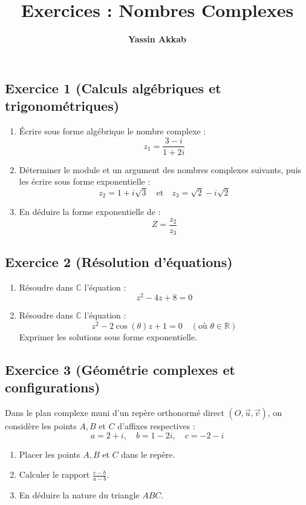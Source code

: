 \documentclass{article}
\title{\textbf{Exercices : Nombres Complexes}}
\author{\textbf{Yassin Akkab}}
\begin{document}
	
	\maketitle
	
	\subsection*{Exercice 1 (Calculs algébriques et trigonométriques)}
	\begin{enumerate}
		\item Écrire sous forme algébrique le nombre complexe :
		\[ z_1 = \frac{3 - i}{1 + 2i} \]
		\item Déterminer le module et un argument des nombres complexes suivants, puis les écrire sous forme exponentielle :
		\[ z_2 = 1 + i\sqrt{3} \quad \text{et} \quad z_3 = \sqrt{2} - i\sqrt{2} \]
		\item En déduire la forme exponentielle de :
		\[ Z = \frac{z_2}{z_3} \]
	\end{enumerate}
	
	\subsection*{Exercice 2 (Résolution d'équations)}
	\begin{enumerate}
		\item Résoudre dans $\mathbb{C}$ l'équation :
		\[ z^2 - 4z + 8 = 0 \]
		\item Résoudre dans $\mathbb{C}$ l'équation :
		\[ z^2 - 2\cos(\theta)z + 1 = 0 \quad (\text{où } \theta \in \mathbb{R}) \]
		Exprimer les solutions sous forme exponentielle.
	\end{enumerate}
	
	\subsection*{Exercice 3 (Géométrie complexes et configurations)}
	Dans le plan complexe muni d'un repère orthonormé direct $(O, \vec{u}, \vec{v})$, on considère les points $A, B$ et $C$ d'affixes respectives :
	\[ a = 2 + i, \quad b = 1 - 2i, \quad c = -2 - i \]
	\begin{enumerate}
		\item Placer les points $A, B$ et $C$ dans le repère.
		\item Calculer le rapport $\frac{c - b}{a - b}$.
		\item En déduire la nature du triangle $ABC$.
	\end{enumerate}
	
\end{document}
